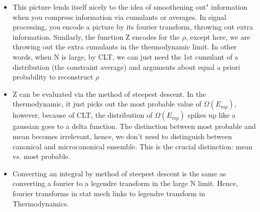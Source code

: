 \begin{itemize}
\item This picture lends itself nicely to the idea of smoothening  out" information when you compress information via cumulants or averages.  In signal processing, you encode a picture by its fourier transform, throwing out extra information.  Similarly, the function Z encodes for the $\rho$, except here, we are throwing out the extra cumulants in the thermodynamic limit.  In other words, when N is large, by CLT, we can just need the 1st cumulant of a distribution (the constraint average) and arguments about equal a priori probability to reconstruct $\rho$

\item  Z can be evaluated via the method of steepest descent.  In the thermodynamic, it just picks out the most probable value of $\Omega (E_{mp})$, however, because of CLT, the distribution of $\Omega(E_{mp})$ spikes up like a gaussian goes to a delta function.  The distinction between most probable and mean becomes irrelevant, hence, we don't need to distinguish between canonical and microcanonical ensemble.  This is the crucial distinction: mean vs. most probable.

\item Converting an integral by method of steepest descent is the same as converting a fourier to a legendre transform in the large N limit.  Hence, fourier transforms in stat mech links to legendre transform in Thermodynamics.
\end{itemize}




